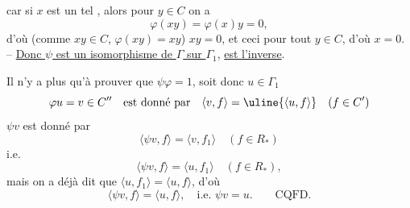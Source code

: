 car si \(x\) est un tel , alors pour \(y\in C\) on a
\[
\varphi(xy)=\varphi(x)y=0,
\]
d'où (comme \(xy\in C\),  \(\varphi(xy)=xy\)) \(xy=0\), et ceci pour tout \(y\in C\), d'où \(x=0\). -- \uline{Donc \(\psi\) est un isomorphisme de \(\Gamma\) sur \(\Gamma_1\)},  \uline{est l'inverse}.

Il n'y a plus qu'à prouver que \(\psi\varphi=1\), soit donc \(u\in\Gamma_1\)
\[
\varphi u=v\in C''\quad\text{est donné par}\quad\langle v,f\rangle=\uline{\langle u,f\rangle}\quad(f\in C')
\]
 \(\psi v\) est donné par
\[
\langle\psi v,f\rangle=\langle v,f_1\rangle\quad(f\in R_*)
\]
i.e.
\[
\langle\psi v,f\rangle=\langle u,f_1\rangle\quad(f\in R_*),
\]
mais on a déjà dit que \(\langle u,f_1\rangle=\langle u,f\rangle\), d'où
\[
\langle\psi v,f\rangle=\langle u,f\rangle,\quad\text{i.e. }\psi v=u.\qquad\text{CQFD.}
\]

